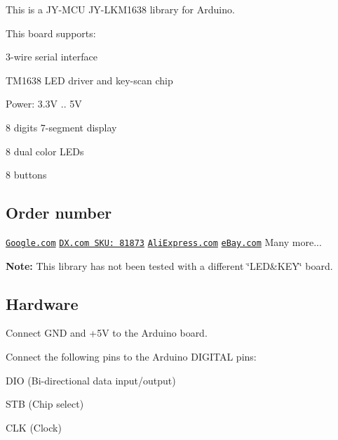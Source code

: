 This is a J\+Y-\/\+M\+CU J\+Y-\/\+L\+K\+M1638 library for Arduino.



This board supports\+:
\begin{DoxyItemize}
\item 3-\/wire serial interface
\item T\+M1638 L\+ED driver and key-\/scan chip
\item Power\+: 3.\+3V .. 5V
\item 8 digits 7-\/segment display
\item 8 dual color L\+E\+Ds
\item 8 buttons
\end{DoxyItemize}

\subsection*{Order number}

\href{https://www.google.nl/search?q=JY-LKM1638}{\tt Google.\+com} \href{http://www.dx.com/p/8x-digital-tube-8x-key-8x-double-color-led-module-81873#.WmR3YTco9aR}{\tt D\+X.\+com S\+K\+U\+: 81873} \href{https://www.aliexpress.com/item/F71A-8-Digital-Tube-8-Key-8-Double-Color-LED-Module-TM1638-Can-be-Cascaded-Replace/2034831073.html?ws_ab_test=searchweb0_0,searchweb201602_1_10065_10344_10068_10342_10343_10340_10341_10084_10083_10618_10304_10615_10307_10301_10313_10059_10534_100031_10103_441_10624_442_10623_10622_10621_10620_10142,searchweb201603_36,ppcSwitch_5&algo_expid=539835e4-fcbf-4f84-870e-c972d12374fa-36&algo_pvid=539835e4-fcbf-4f84-870e-c972d12374fa&priceBeautifyAB=2}{\tt Ali\+Express.\+com} \href{https://www.ebay.com/itm/8xDigital-Tube-8x-Key-8x-Double-Color-LED-Module-TM1638-For-AVR-Arduino-NEW/172744309516?epid=814196876&hash=item28385cfb0c:g:bmsAAOSw-29ZS4-c}{\tt e\+Bay.\+com} Many more...

{\bfseries Note\+:} This library has not been tested with a different \char`\"{}\+L\+E\+D\&\+K\+E\+Y\char`\"{} board.

\subsection*{Hardware}

Connect G\+ND and +5V to the Arduino board.

Connect the following pins to the Arduino D\+I\+G\+I\+T\+AL pins\+:
\begin{DoxyItemize}
\item D\+IO (Bi-\/directional data input/output)
\item S\+TB (Chip select)
\item C\+LK (Clock)
\end{DoxyItemize}

